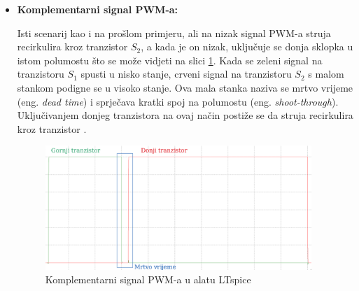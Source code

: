 \documentclass[diplomskirad]{fer}
\begin{document}
\begin{itemize}
	\item \textbf{Komplementarni signal PWM-a:}

	      Isti scenarij kao i na prošlom primjeru, ali na nizak signal PWM-a struja
	      recirkulira kroz tranzistor $S_2$, a kada je on nizak, uključuje se donja
	      sklopka u istom polumostu što se može vidjeti na slici \ref{fig:soft_chopping}.
	      Kada se zeleni signal na tranzistoru $S_1$ spusti u nisko stanje, crveni signal
	      na tranzistoru $S_2$ s malom stankom podigne se u visoko stanje. Ova mala
	      stanka naziva se mrtvo vrijeme (eng. \textit{dead time}) i sprječava kratki
	      spoj na polumostu (eng. \textit{shoot-through}). Uključivanjem donjeg
	      tranzistora na ovaj način postiže se da struja recirkulira kroz tranzistor
	      \cite{TI2015}. 
	      \begin{figure}[h!]
		      \centering
		      \includegraphics[width=0.95\textwidth]{Figures/soft_chopping.png}
		      \caption{Komplementarni signal PWM-a u alatu LTspice}
		      \label{fig:soft_chopping}
	      \end{figure}

\end{itemize}
\end{document}
